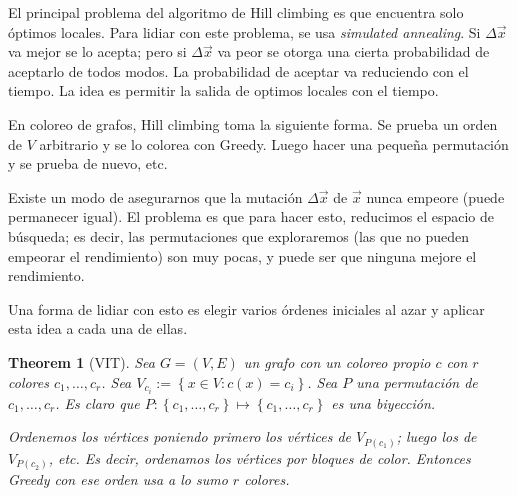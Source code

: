 \documentclass[a4paper, 12pt]{article}
\newtheorem{theorem}{Theorem}
\newtheorem{theorem}{Theorem}
\begin{document}
El principal problema del algoritmo de Hill climbing es que encuentra solo
óptimos locales. Para lidiar con este problema, se usa \textit{simulated
annealing}. Si $\Delta \vec{x}$ va mejor se lo acepta; pero si $\Delta \vec{x}$
va peor se otorga una cierta probabilidad de aceptarlo de todos modos. La
probabilidad de aceptar va reduciendo con el tiempo. La idea es permitir la
salida de optimos locales con el tiempo.

En coloreo de grafos, Hill climbing toma la siguiente forma. Se prueba un orden
de $V$ arbitrario y se lo colorea con Greedy. Luego hacer una pequeña
permutación y se prueba de nuevo, etc. 

Existe un modo de asegurarnos que la mutación $\Delta \vec{x}$ de $\vec{x}$
nunca empeore (puede permanecer igual). El problema es que para hacer esto,
reducimos el espacio de búsqueda; es decir, las permutaciones que
exploraremos (las que no pueden empeorar el rendimiento) son muy pocas, y puede
ser que ninguna mejore el rendimiento. 

Una forma de lidiar con esto es elegir varios órdenes iniciales al azar y
aplicar esta idea a cada una de ellas.

\begin{theorem}[VIT]

    Sea $G = (V, E) $ un grafo con un coloreo propio $c$ con $r$ colores $c_1,
    \ldots, c_r$. Sea $V_{c_i} := \left\{ x \in V : c(x) = c_i \right\} $. Sea $P$
    una permutación de $c_1, \ldots, c_r$. Es claro que $P : \left\{ c_1, \ldots, c_r
    \right\} \mapsto \left\{ c_1, \ldots, c_r \right\} $ es una biyección.


    Ordenemos los vértices poniendo primero los vértices de $V_{P(c_1)}$; luego
    los de $V_{P(c_2)}$, etc. Es decir, ordenamos los vértices por bloques de
    color. Entonces Greedy con ese orden usa a lo sumo $r$ colores.
    
\end{theorem}
\end{document}
